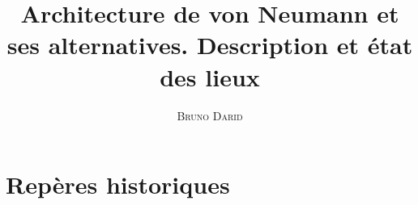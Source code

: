 \documentclass[11pt,french]{article}
\title{Architecture de von Neumann et ses alternatives. Description et état des lieux}
\author{\textsc{Bruno Darid}}
\begin{document}
    \renewcommand{\contentsname}{\textsc{Plan}}    
 	\maketitle
 	\tableofcontents
    
    

    
    \hypertarget{repuxe8res-historiques}{%
\section{Repères historiques}\label{repuxe8res-historiques}}

\end{document}
